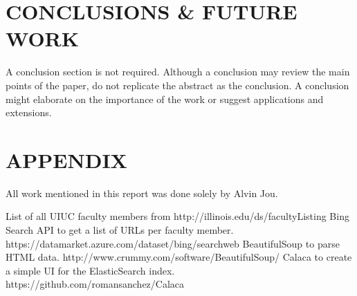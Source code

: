 \documentclass[letterpaper, 10 pt, conference]{ieeeconf}
\begin{document}
	\section{CONCLUSIONS \& FUTURE WORK}

	A conclusion section is not required. Although a conclusion may review the main points of the paper, do not replicate the abstract as the conclusion. A conclusion might elaborate on the importance of the work or suggest applications and extensions. 

	\addtolength{\textheight}{-12cm}   %
	\section*{APPENDIX}
	All work mentioned in this report was done solely by Alvin Jou.

	\begin{thebibliography}{99}
		 List of all UIUC faculty members from http://illinois.edu/ds/facultyListing
		 Bing Search API to get a list of URLs per faculty member. https://datamarket.azure.com/dataset/bing/searchweb
		 BeautifulSoup to parse HTML data. http://www.crummy.com/software/BeautifulSoup/
		 Calaca to create a simple UI for the ElasticSearch index. https://github.com/romansanchez/Calaca
	\end{thebibliography}
\end{document}
